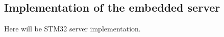 \newpage
\subsection{Implementation of the embedded server}
Here will be STM32 server implementation.


